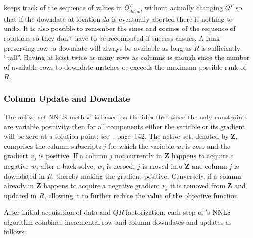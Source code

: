 \pacora keeps track of the sequence of values in $Q^T_{dd,dd}$ without actually changing $Q^T$
so that if the downdate at location $dd$ is eventually aborted there is nothing to undo.
It is also possible to remember the sines and cosines of the sequence of rotations
so they don't have to be recomputed if success ensues.
A rank-preserving row to downdate will always be available as long as $R$ is sufficiently ``tall''.
Having at least twice as many rows as columns is enough since the number of available rows to downdate
matches or exceeds the maximum possible rank of $R$.

\subsubsection{Column Update and Downdate}

The active-set NNLS method is based on the idea that since the only constraints are variable positivity
then for all components either the variable or its gradient will be zero at a solution point; see~\cite{BoVa}, page~142.
The active set, denoted by \textbf{Z}, comprises the column subscripts $j$ for which the variable $w_j$ is zero and the gradient $v_j$ is positive. If a column $j$ not currently in \textbf{Z} happens to acquire a negative $w_j$ after a back-solve, $w_j$ is zeroed,
$j$ is moved into \textbf{Z} and column $j$ is downdated in $R$, thereby making the gradient positive.
Conversely, if a column already in \textbf{Z} happens to acquire a negative gradient $v_j$ it is removed from \textbf{Z} and updated in $R$,
allowing it to further reduce the value of the objective function.

After initial acquisition of data and $QR$ factorization, each step of \pacora's NNLS algorithm
combines incremental row and column downdates and updates as follows:

